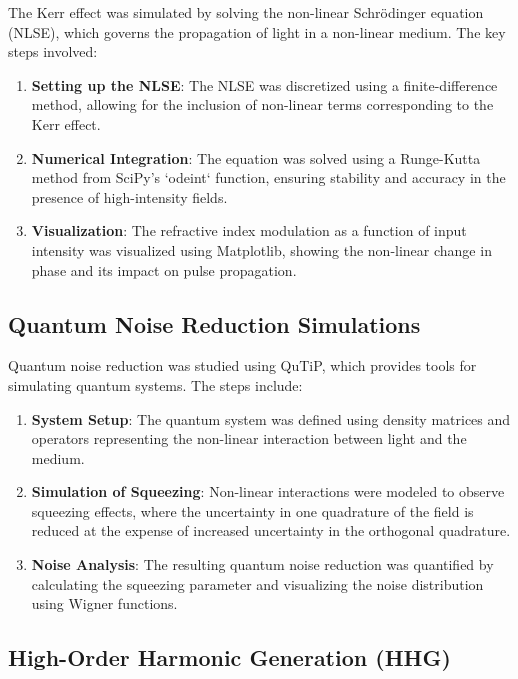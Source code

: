 \documentclass[12pt]{article}
\begin{document}
The Kerr effect was simulated by solving the non-linear Schrödinger equation (NLSE), which governs the propagation of light in a non-linear medium. The key steps involved:

\begin{enumerate}
    \item \textbf{Setting up the NLSE}: The NLSE was discretized using a finite-difference method, allowing for the inclusion of non-linear terms corresponding to the Kerr effect.
    \item \textbf{Numerical Integration}: The equation was solved using a Runge-Kutta method from SciPy's `odeint` function, ensuring stability and accuracy in the presence of high-intensity fields.
    \item \textbf{Visualization}: The refractive index modulation as a function of input intensity was visualized using Matplotlib, showing the non-linear change in phase and its impact on pulse propagation.
\end{enumerate}

\subsection{Quantum Noise Reduction Simulations}

Quantum noise reduction was studied using QuTiP, which provides tools for simulating quantum systems. The steps include:

\begin{enumerate}
    \item \textbf{System Setup}: The quantum system was defined using density matrices and operators representing the non-linear interaction between light and the medium.
    \item \textbf{Simulation of Squeezing}: Non-linear interactions were modeled to observe squeezing effects, where the uncertainty in one quadrature of the field is reduced at the expense of increased uncertainty in the orthogonal quadrature.
    \item \textbf{Noise Analysis}: The resulting quantum noise reduction was quantified by calculating the squeezing parameter and visualizing the noise distribution using Wigner functions.
\end{enumerate}

\subsection{High-Order Harmonic Generation (HHG)}
\end{document}
